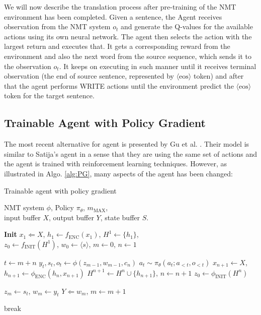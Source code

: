 \documentclass{sfuthesis}
\begin{document}
We will now describe the translation process after pre-training of the NMT environment has been completed. Given a sentence, the Agent receives observation from the NMT system $o_t$ and generate the Q-values for the available actions using its own neural network. The agent then selects the action with the largest return and executes that. It gets a corresponding reward from the environment and also the next word from the source sequence, which sends it to the observation $o_t$. It keeps on executing in such manner until it receives terminal observation (the end of source sentence, represented by $\langle \text{eos} \rangle$ token) and after that the agent performs WRITE actions until the environment predict the $\langle \text{eos} \rangle$ token for the target sentence.

\subsection{Trainable Agent with Policy Gradient}\label{sub:SNMT3}
The most recent alternative for agent is presented by Gu et al. \cite{gu:2017:EACL}. Their model is similar to Satija's agent in a sense that they are using the same set of actions and the agent is trained with reinforcement learning techniques. However, as illustrated in Algo. \ref{alg:PG}, many aspects of the agent has been changed:
\begin{algorithm}[H]
\caption{Trainable agent with policy gradient}
\begin{algorithmic}[1] \label{alg:PG}
\REQUIRE NMT system $\phi$, Policy $\pi_{\theta}$, $m_{\text{MAX}}$,\\
         input buffer $X$, output buffer $Y$, state buffer $S$.

\STATE \textbf{Init} $x_1 \Leftarrow X$, $h_1 \leftarrow f_{\text{ENC}}(x_1) $, $H^{1} \leftarrow \{h_1\}$,\\
    $z_0 \leftarrow f_{\text{INIT}}(H^1)$, $w_0 \leftarrow \langle s \rangle$, $m \leftarrow 0$, $n \leftarrow 1$

\STATE $t \leftarrow m + n $
\STATE $y_{t}, s_{t}, o_{t} \leftarrow \phi(z_{m-1}, w_{m-1}, c_{n})$
\STATE $a_t \sim \pi_{\theta}(a_t; a_{<t}, o_{<t})$
\STATE $x_{n+1} \leftarrow X$, $h_{n+1} \leftarrow \phi_{\text{ENC}}(h_n, x_{n+1})$
\STATE $H^{n+1} \leftarrow H^{n} \cup \{ h_{n + 1} \}$, $n \leftarrow n + 1$
 \STATE $z_0 \leftarrow \phi_{\text{INIT}}(H^{n})$ \ENDIF

\STATE $z_{m} \leftarrow s_{t}$, $w_{m} \leftarrow y_{t}$
\STATE $Y \Leftarrow w_{m}$, $m \leftarrow m + 1$
\ENDIF

 \STATE break \ENDIF
\ENDWHILE
\end{algorithmic}
\end{algorithm}
\end{document}
